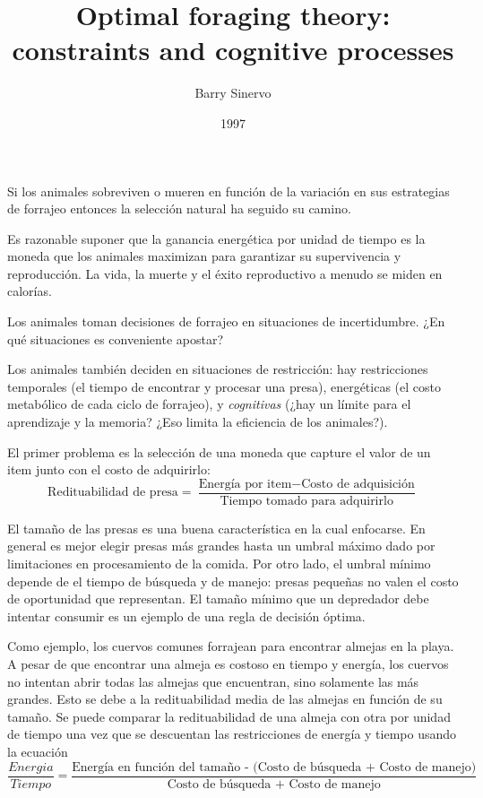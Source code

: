 \documentclass[a4paper,12pt]{article}
\title{Optimal foraging theory: constraints and cognitive processes}
\author{Barry Sinervo}
\date{1997}
\begin{document}
{\scshape\bfseries \maketitle}

Si los animales sobreviven o mueren en función de la variación en sus estrategias de forrajeo entonces la selección natural ha seguido su camino.

Es razonable suponer que la ganancia energética por unidad de tiempo es la moneda que los animales maximizan para garantizar su supervivencia y reproducción. La vida, la muerte y el éxito reproductivo a menudo se miden en calorías.

Los animales toman decisiones de forrajeo en situaciones de incertidumbre. ¿En qué situaciones es conveniente apostar?

Los animales también deciden en situaciones de restricción: hay restricciones temporales (el tiempo de encontrar y procesar una presa), energéticas (el costo metabólico de cada ciclo de forrajeo), y {\itshape cognitivas} (¿hay un límite para el aprendizaje y la memoria? ¿Eso limita la eficiencia de los animales?).

El primer problema es la selección de una moneda que capture el valor de un item junto con el costo de adquirirlo:
\[
    \mbox{Redituabilidad de presa}=
    \frac{
        \mbox{Energía por item} - \mbox{Costo de adquisición}
    }{
    \mbox{Tiempo tomado para adquirirlo}
    }
\]

El tamaño de las presas es una buena característica en la cual enfocarse. En general es mejor elegir presas más grandes hasta un umbral máximo dado por limitaciones en procesamiento de la comida. Por otro lado, el umbral mínimo depende de el tiempo de búsqueda y de manejo: presas pequeñas no valen el costo de oportunidad que representan. El tamaño mínimo que un depredador debe intentar consumir es un ejemplo de una regla de decisión óptima.

Como ejemplo, los cuervos comunes forrajean para encontrar almejas en la playa. A pesar de que encontrar una almeja es costoso en tiempo y energía, los cuervos no intentan abrir todas las almejas que encuentran, sino solamente las más grandes. Esto se debe a la redituabilidad media de las almejas en función de su tamaño. Se puede comparar la redituabilidad de una almeja con otra por unidad de tiempo una vez que se descuentan las restricciones de energía y tiempo usando la ecuación
\[
\frac{Energia}{Tiempo} = 
\frac{
    \mbox{Energía en función del tamaño - (Costo de búsqueda + Costo de manejo)}
}{
\mbox{Costo de búsqueda + Costo de manejo}
}
\]
\end{document}
